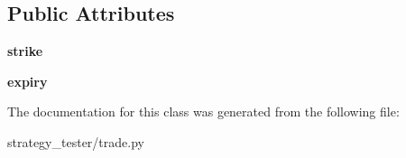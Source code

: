 \subsection*{\-Public \-Attributes}
\begin{DoxyCompactItemize}
\item 
\hypertarget{classstrategy__tester_1_1trade_1_1TradeVanillaEuroCall_a2c0276aa5243470a90f3b722b70ecf17}{{\bfseries strike}}\label{classstrategy__tester_1_1trade_1_1TradeVanillaEuroCall_a2c0276aa5243470a90f3b722b70ecf17}

\item 
\hypertarget{classstrategy__tester_1_1trade_1_1TradeVanillaEuroCall_ab16eda4d782a4e1f3eb725ba76f0adcb}{{\bfseries expiry}}\label{classstrategy__tester_1_1trade_1_1TradeVanillaEuroCall_ab16eda4d782a4e1f3eb725ba76f0adcb}

\end{DoxyCompactItemize}


\-The documentation for this class was generated from the following file\-:\begin{DoxyCompactItemize}
\item 
strategy\-\_\-tester/trade.\-py\end{DoxyCompactItemize}
